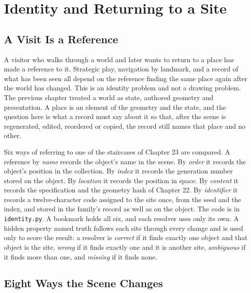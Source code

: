 \chapter{Identity and Returning to a Site}

\section{A Visit Is a Reference}

A visitor who walks through a world and later wants to return to a place has made a reference to it. Strategic play, navigation by landmark, and a record of what has been seen all depend on the reference finding the same place again after the world has changed. This is an identity problem and not a drawing problem. The previous chapter treated a world as state, authored geometry and presentation. A place is an element of the geometry and the state, and the question here is what a record must say about it so that, after the scene is regenerated, edited, reordered or copied, the record still names that place and no other.

Six ways of referring to one of the staircases of Chapter 23 are compared. A reference by \emph{name} records the object's name in the scene. By \emph{order} it records the object's position in the collection. By \emph{index} it records the generation number stored on the object. By \emph{location} it records the position in space. By \emph{content} it records the specification and the geometry hash of Chapter 22. By \emph{identifier} it records a twelve-character code assigned to the site once, from the seed and the index, and stored in the family's record as well as on the object. The code is in \texttt{identity.py}. A bookmark holds all six, and each resolver uses only its own. A hidden property named truth follows each site through every change and is used only to score the result: a resolver is \emph{correct} if it finds exactly one object and that object is the site, \emph{wrong} if it finds exactly one and it is another site, \emph{ambiguous} if it finds more than one, and \emph{missing} if it finds none.

\section{Eight Ways the Scene Changes}

